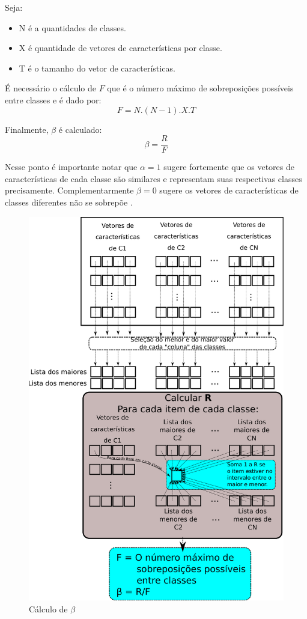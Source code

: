 				\par Seja:
				\begin{itemize}
					\item N é a quantidades de classes.
					\item X é quantidade de vetores de características por classe.
					\item T é o tamanho do vetor de características.
				\end{itemize}
				
				\par É necessário o cálculo de $F$ que é o número máximo de sobreposições possíveis entre classes e é dado por:
				\begin{equation}
						F=N.(N-1).X.T
				\end{equation}
				\par Finalmente, $\beta$ é calculado:
				\begin{equation}
					\beta=\dfrac{R}{F}
				\end{equation}
			
				\par Nesse ponto é importante notar que $\alpha=1$ sugere fortemente que os vetores de características de cada classe são similares e representam suas respectivas classes precisamente. Complementarmente $\beta=0$ sugere os vetores de características de classes diferentes não se sobrepõe \cite{8588433}.
				
				\begin{figure}[h]
					\centering
					\includegraphics[width=0.55\linewidth]{images/betaCalculation.pdf}
					\caption{Cálculo de $\beta$}
					\label{fig:betacalculation}
				\end{figure}
				
